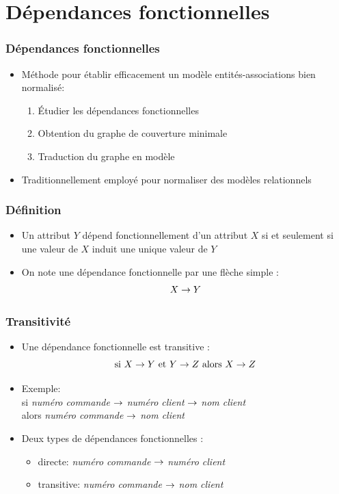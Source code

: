 \section{Dépendances fonctionnelles}

\begin{frame}
  \frametitle{Dépendances fonctionnelles}
  \begin{itemize}
    \item Méthode pour établir efficacement un modèle entités-associations bien normalisé:
      \begin{enumerate}
        \item Étudier les dépendances fonctionnelles
        \item Obtention du graphe de couverture minimale
        \item Traduction du graphe en modèle
      \end{enumerate}
    \item Traditionnellement employé pour normaliser des modèles relationnels
  \end{itemize}
\end{frame}

\begin{frame}
  \frametitle{Définition}
  \begin{itemize}
    \item Un attribut $Y$ dépend fonctionnellement d'un attribut $X$ si et seulement si une valeur de $X$ induit une
      unique valeur de $Y$
    \item On note une dépendance fonctionnelle par une flèche simple : $$X \rightarrow Y$$
  \end{itemize}
\end{frame}

\begin{frame}
  \frametitle{Transitivité}
  \begin{itemize}
    \item Une dépendance fonctionnelle est transitive : $$\text{si } X \rightarrow Y \text{ et } Y \rightarrow Z \text{ alors } X \rightarrow Z$$
    \item Exemple:\\
      si \emph{numéro commande} $\rightarrow$ \emph{numéro client} $\rightarrow$ \emph{nom client}\\
      alors \emph{numéro commande} $\rightarrow$ \emph{nom client}
    \item Deux types de dépendances fonctionnelles :
      \begin{itemize}
        \item directe: \emph{numéro commande} $\rightarrow$ \emph{numéro client}
        \item transitive: \emph{numéro commande} $\rightarrow$ \emph{nom client}
      \end{itemize}
  \end{itemize}
\end{frame}

